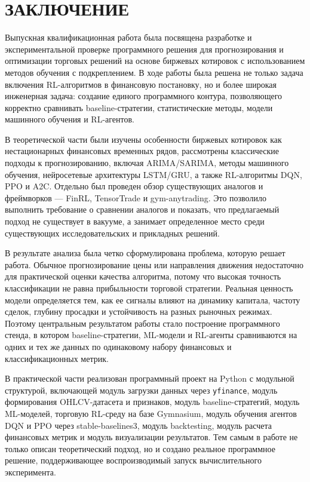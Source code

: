 \clearpage
\section*{ЗАКЛЮЧЕНИЕ}

Выпускная квалификационная работа была посвящена разработке и экспериментальной проверке программного решения для прогнозирования и оптимизации торговых решений на основе биржевых котировок с использованием методов обучения с подкреплением. В ходе работы была решена не только задача включения RL-алгоритмов в финансовую постановку, но и более широкая инженерная задача: создание единого программного контура, позволяющего корректно сравнивать baseline-стратегии, статистические методы, модели машинного обучения и RL-агентов.

В теоретической части были изучены особенности биржевых котировок как нестационарных финансовых временных рядов, рассмотрены классические подходы к прогнозированию, включая ARIMA/SARIMA, методы машинного обучения, нейросетевые архитектуры LSTM/GRU, а также RL-алгоритмы DQN, PPO и A2C. Отдельно был проведен обзор существующих аналогов и фреймворков — FinRL, TensorTrade и gym-anytrading. Это позволило выполнить требование о сравнении аналогов и показать, что предлагаемый подход не существует в вакууме, а занимает определенное место среди существующих исследовательских и прикладных решений.

В результате анализа была четко сформулирована проблема, которую решает работа. Обычное прогнозирование цены или направления движения недостаточно для практической оценки качества алгоритма, потому что высокая точность классификации не равна прибыльности торговой стратегии. Реальная ценность модели определяется тем, как ее сигналы влияют на динамику капитала, частоту сделок, глубину просадки и устойчивость на разных рыночных режимах. Поэтому центральным результатом работы стало построение программного стенда, в котором baseline-стратегии, ML-модели и RL-агенты сравниваются на одних и тех же данных по одинаковому набору финансовых и классификационных метрик.

В практической части реализован программный проект на Python с модульной структурой, включающей модуль загрузки данных через \texttt{yfinance}, модуль формирования OHLCV-датасета и признаков, модуль baseline-стратегий, модуль ML-моделей, торговую RL-среду на базе Gymnasium, модуль обучения агентов DQN и PPO через stable-baselines3, модуль backtesting, модуль расчета финансовых метрик и модуль визуализации результатов. Тем самым в работе не только описан теоретический подход, но и создано реальное программное решение, поддерживающее воспроизводимый запуск вычислительного эксперимента.

